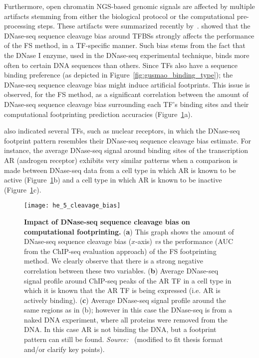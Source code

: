 Furthermore, open chromatin NGS-based genomic signals are affected by multiple artifacts stemming from either the biological protocol or the computational pre-processing steps. These artifacts were summarized recently by~\cite{meyer2014}. \cite{he2014} showed that the DNase-seq sequence cleavage bias around TFBSs strongly affects the performance of the FS method, in a TF-specific manner. Such bias stems from the fact that the DNase I enzyme, used in the DNase-seq experimental technique, binds more often to certain DNA sequences than others. Since TFs also have a sequence binding preference (as depicted in Figure~\ref{fig:gusmao_binding_type}); the DNase-seq sequence cleavage bias might induce artificial footprints. This issue is observed, for the FS method, as a significant correlation between the amount of DNase-seq sequence cleavage bias surrounding each TF's binding sites and their computational footprinting prediction accuracies (Figure~\ref{fig:he_cleavage_bias}a).

\cite{he2014} also indicated several TFs, such as nuclear receptors, in which the DNase-seq footprint pattern resembles their DNase-seq sequence cleavage bias estimate. For instance, the average DNase-seq signal around binding sites of the transcription AR (androgen receptor) exhibits very similar patterns when a comparison is made between DNase-seq data from a cell type in which AR is known to be active (Figure~\ref{fig:he_cleavage_bias}b) and a cell type in which AR is known to be inactive (Figure~\ref{fig:he_cleavage_bias}c). 

\begin{figure}[h!]
\centering
\texttt{[image: he\_5\_cleavage\_bias]}
\caption[Impact of DNase-seq sequence cleavage bias on computational footprinting]{\textbf{Impact of DNase-seq sequence cleavage bias on computational footprinting.} (\textbf{a}) This graph shows the amount of DNase-seq sequence cleavage bias ($x$-axis) \emph{vs} the performance (AUC from the ChIP-seq evaluation approach) of the FS footprinting method. We clearly observe that there is a strong negative correlation between these two variables. (\textbf{b}) Average DNase-seq signal profile around ChIP-seq peaks of the AR TF in a cell type in which it is known that the AR TF is being expressed (i.e. AR is actively binding). (\textbf{c}) Average DNase-seq signal profile around the same regions as in (b); however in this case the DNase-seq is from a naked DNA experiment, where all proteins were removed from the DNA. In this case AR is not binding the DNA, but a footprint pattern can still be found. \emph{Source:~\cite{he2014}} (modified to fit thesis format and/or clarify key points).}
\label{fig:he_cleavage_bias}
\end{figure}

